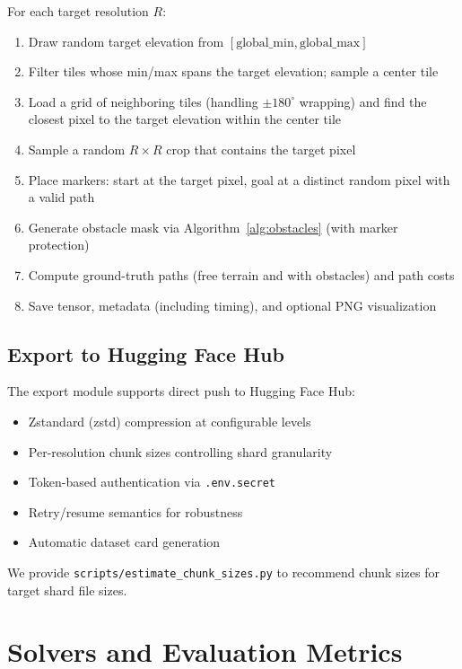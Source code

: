 \documentclass{article}
\begin{document}
For each target resolution $R$:
\begin{enumerate}[noitemsep]
    \item Draw random target elevation from $[\text{global\_min}, \text{global\_max}]$
    \item Filter tiles whose min/max spans the target elevation; sample a center tile
    \item Load a grid of neighboring tiles (handling $\pm 180^\circ$ wrapping) and find the closest pixel to the target elevation within the center tile
    \item Sample a random $R \times R$ crop that contains the target pixel
    \item Place markers: start at the target pixel, goal at a distinct random pixel with a valid path
    \item Generate obstacle mask via Algorithm~\ref{alg:obstacles} (with marker protection)
    \item Compute ground-truth paths (free terrain and with obstacles) and path costs
    \item Save tensor, metadata (including timing), and optional PNG visualization
\end{enumerate}

\subsection{Export to Hugging Face Hub}

The export module supports direct push to Hugging Face Hub:
\begin{itemize}[noitemsep]
    \item Zstandard (zstd) compression at configurable levels
    \item Per-resolution chunk sizes controlling shard granularity
    \item Token-based authentication via \texttt{.env.secret}
    \item Retry/resume semantics for robustness
    \item Automatic dataset card generation
\end{itemize}

We provide \texttt{scripts/estimate\_chunk\_sizes.py} to recommend chunk sizes for target shard file sizes.

\section{Solvers and Evaluation Metrics}
\label{sec:solvers}
\end{document}
